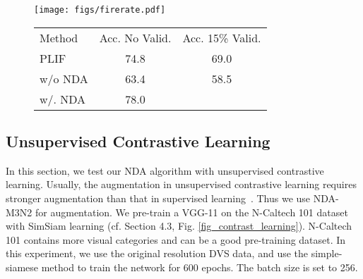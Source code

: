 \documentclass[runningheads]{llncs}
\newcommand{\bftab}{\fontseries{b}\selectfont}
\begin{document}
\begin{figure}[t]
\noindent\begin{minipage}{\textwidth}
\begin{minipage}{0.49\textwidth}
\centering
\texttt{[image: figs/firerate.pdf]}
\label{fig_fire}
\end{minipage}
\hfill
\begin{minipage}{0.49\textwidth}
\centering
{}
\centering
\begin{adjustbox}{max width=\linewidth}
\begin{tabular}[b]{l  c  c} 
\toprule
{{\bftab Method}} & {\bftab Acc. No Valid.} & {\bftab Acc. 15\% Valid.} \\
\noalign{\smallskip}
\hline
\noalign{\smallskip}
PLIF \cite{fang2021incorporating} & 74.8 & 69.0 \\ 
\noalign{\smallskip}
\hline
\noalign{\smallskip}
{\textcolor{myblue}{\bftab w/o NDA}} & 63.4 & 58.5 \\
{\textcolor{myred}{\bftab w/. NDA}} & 78.0 & {\bftab 74.4}\\
\bottomrule
\end{tabular}
\end{adjustbox}
\label{tab_val}
\end{minipage}
\end{minipage}
\end{figure}

\subsection{Unsupervised Contrastive Learning}
\label{sec_ssl}
In this section, we test our NDA algorithm with unsupervised contrastive learning. Usually, the augmentation in unsupervised contrastive learning requires stronger augmentation than that in supervised learning~\cite{chen2020simple}. Thus we use NDA-M3N2 for augmentation. We pre-train a VGG-11 on the N-Caltech 101 dataset with SimSiam learning (cf. Section 4.3, Fig. \ref{fig_contrast_learning}). N-Caltech 101 contains more visual categories and can be a good pre-training dataset.
In this experiment, we use the original  resolution DVS data, and use the simple-siamese method to train the network for 600 epochs. The batch size is set to 256. 
\end{document}
